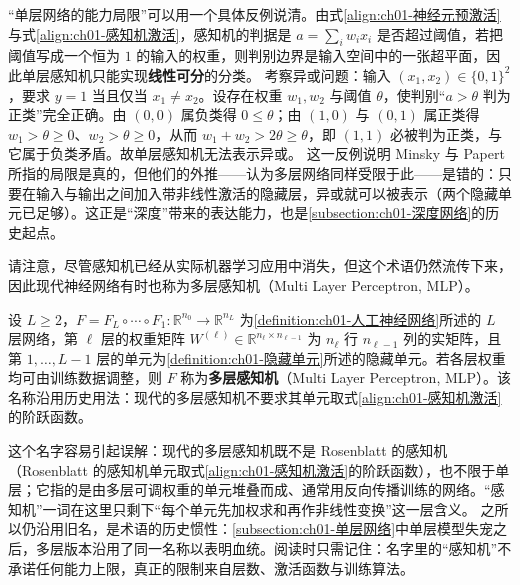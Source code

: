 \documentclass[../../main.tex]{subfiles}
\begin{document}
\begin{remark}
“单层网络的能力局限”可以用一个具体反例说清。由式\eqref{align:ch01-神经元预激活}与式\eqref{align:ch01-感知机激活}，感知机的判据是 $a=\sum_i w_i x_i$ 是否超过阈值，若把阈值写成一个恒为 $1$ 的输入的权重，则判别边界是输入空间中的一张超平面，因此单层感知机只能实现\textbf{线性可分}的分类。
考察异或问题：输入 $(x_1,x_2)\in\{0,1\}^{2}$，要求 $y=1$ 当且仅当 $x_1\neq x_2$。设存在权重 $w_1,w_2$ 与阈值 $\theta$，使判别“$a>\theta$ 判为正类”完全正确。由 $(0,0)$ 属负类得 $0\leqslant\theta$；由 $(1,0)$ 与 $(0,1)$ 属正类得 $w_1>\theta\geqslant 0$、$w_2>\theta\geqslant 0$，从而 $w_1+w_2>2\theta\geqslant\theta$，即 $(1,1)$ 必被判为正类，与它属于负类矛盾。故单层感知机无法表示异或。
这一反例说明 Minsky 与 Papert 所指的局限是真的，但他们的外推——认为多层网络同样受限于此——是错的：只要在输入与输出之间加入带非线性激活的隐藏层，异或就可以被表示（两个隐藏单元已足够）。这正是“深度”带来的表达能力，也是\cref{subsection:ch01-深度网络}的历史起点。
\end{remark}

请注意，尽管感知机已经从实际机器学习应用中消失，但这个术语仍然流传下来，因此现代神经网络有时也称为多层感知机（Multi Layer Perceptron, MLP）。

\begin{definition}[多层感知机]\label{definition:ch01-多层感知机}
设 $L\geqslant2$，$F=F_{L}\circ\cdots\circ F_{1}:\mathbb{R}^{n_{0}}\to\mathbb{R}^{n_{L}}$ 为\cref{definition:ch01-人工神经网络}所述的 $L$ 层网络，第 $\ell$ 层的权重矩阵 $W^{(\ell)}\in\mathbb{R}^{n_{\ell}\times n_{\ell-1}}$ 为 $n_{\ell}$ 行 $n_{\ell-1}$ 列的实矩阵，且第 $1,\dots,L-1$ 层的单元为\cref{definition:ch01-隐藏单元}所述的隐藏单元。若各层权重均可由训练数据调整，则 $F$ 称为\textbf{多层感知机}（Multi Layer Perceptron, MLP）。该名称沿用历史用法：现代的多层感知机不要求其单元取式\eqref{align:ch01-感知机激活}的阶跃函数。
\end{definition}

\begin{remark}
这个名字容易引起误解：现代的多层感知机既不是 Rosenblatt 的感知机（Rosenblatt 的感知机单元取式\eqref{align:ch01-感知机激活}的阶跃函数），也不限于单层；它指的是由多层可调权重的单元堆叠而成、通常用反向传播训练的网络。“感知机”一词在这里只剩下“每个单元先加权求和再作非线性变换”这一层含义。
之所以仍沿用旧名，是术语的历史惯性：\cref{subsection:ch01-单层网络}中单层模型失宠之后，多层版本沿用了同一名称以表明血统。阅读时只需记住：名字里的“感知机”不承诺任何能力上限，真正的限制来自层数、激活函数与训练算法。
\end{remark}
\end{document}
